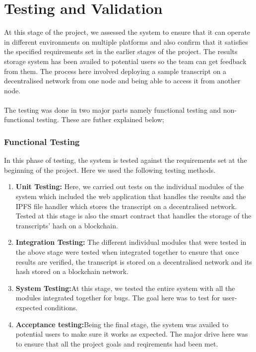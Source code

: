 \section{Testing and Validation}
At this stage of the project, we assessed the system to ensure that it can operate in different environments on multiple platforms and also confirm that it satisfies the specified requirements set in the earlier stages of the project. The results storage system has been availed to potential users so the team can get feedback from them. The process here involved deploying a sample transcript on a decentralised network from one node and being able to access it from another node.\\~\\
The testing was done in two major parts namely functional testing and non-functional testing. These are futher explained below;
\subsubsection{Functional Testing}
In this phase of testing, the system is tested against the requirements set at the beginning of the project. Here we used the following testing methods.
\begin{enumerate}
\item \textbf{Unit Testing:} Here, we carried out tests on the individual modules of the system which included the web application that handles the results and the IPFS file handler which stores the transcript on a decentralised network. Tested at this stage is also the smart contract that handles the storage of the transcripts' hash on a blockchain.
\item \textbf{Integration Testing:} The different individual modules that were tested in the above stage were tested when integrated together to ensure that once results are verified, the transcript is stored on a decentralised network and its hash stored on a blockchain network.
\item \textbf{System Testing:}At this stage, we tested the entire system with all the modules integrated together for bugs. The goal here was to test for user-expected conditions. 
\item \textbf{Acceptance testing:}Being the final stage, the system was availed to potential users to make sure it works as expected. The major drive here was to ensure that all the project goals and reqirements had been met.
\end{enumerate}

